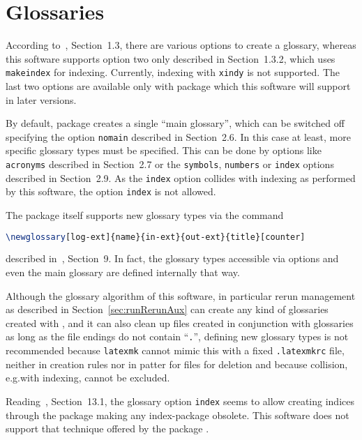 \section{Glossaries}\label{sec:gapGlossaries}

According to~\cite{GloP4_54}, Section~1.3, 
there are various options to create a glossary, 
whereas this software supports option two only described in Section~1.3.2, 
which uses \texttt{makeindex} for indexing. 
Currently, indexing with \texttt{xindy} is not supported. 
The last two options are available only with package  
which this software will support in later versions. 

By default, package  creates a single ``main glossary'', 
which can be switched off specifying the option \texttt{nomain} 
described in Section~2.6. 
In this case at least, more specific glossary types must be specified. 
This can be done by options like \texttt{acronyms} described in Section~2.7 
or the \texttt{symbols},
\texttt{numbers} or \texttt{index} options described in Section~2.9. 
As the \texttt{index} option collides with indexing as performed by this software, 
the option \texttt{index} is not allowed. 

The package  itself 
supports new glossary types via the command
%
\begin{lstlisting}[language=TeX, basicstyle=\small]
\newglossary[log-ext]{name}{in-ext}{out-ext}{title}[counter]
\end{lstlisting}
%
described in~\cite{GloP4_54}, Section~9. 
In fact, the glossary types accessible via options and even the main glossary 
are defined internally that way. 

Although the glossary algorithm of this software, 
in particular rerun management as described in Section~\ref{sec:runRerunAux}
can create any kind of glossaries created with , 
and it can also clean up files created in conjunction with glossaries 
as long as the file endings do not contain ``\texttt{.}'',
defining new glossary types is not recommended 
because \texttt{latexmk} cannot mimic this 
with a fixed \texttt{.latexmkrc} file, neither in creation rules 
nor in patter for files for deletion  
and because collision, e.g.\@ with indexing, cannot be excluded. 

Reading~\cite{GloP4_54}, Section~13.1, the glossary option \texttt{index} 
seems to allow creating indices through the  package 
making any index-package obsolete. 
This software does not support that technique offered by the package . 


